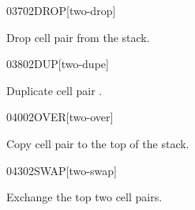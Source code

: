 \begin{worddef}{0370}{2DROP}[two-drop]
\item {}

	Drop cell pair  from the stack.

	\begin{testing} %
	\end{testing}
\end{worddef}


\begin{worddef}{0380}{2DUP}[two-dupe]
\item {}

	Duplicate cell pair .

	\begin{testing} %
	\end{testing}
\end{worddef}


\begin{worddef}{0400}{2OVER}[two-over]
\item {}

	Copy cell pair  to the top of the stack.

	\begin{testing} %
	\end{testing}
\end{worddef}


\begin{worddef}{0430}{2SWAP}[two-swap]
\item {}

	Exchange the top two cell pairs.

	\begin{testing} %
	\end{testing}
\end{worddef}


